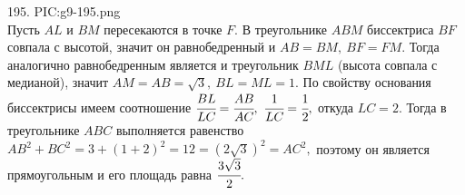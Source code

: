 195. {{PIC:g9-195.png}}\\
Пусть $AL$ и $BM$ пересекаются в точке $F.$ В треугольнике $ABM$ биссектриса $BF$ совпала с высотой, значит он равнобедренный и $AB=BM,\ BF=FM.$ Тогда аналогично равнобедренным является и треугольник $BML$ (высота совпала с медианой), значит $AM=AB=\sqrt{3},\ BL=ML=1.$ По свойству основания биссектрисы имеем соотношение
$\cfrac{BL}{LC}=\cfrac{AB}{AC},\ \cfrac{1}{LC}=\cfrac{1}{2},$ откуда $LC=2.$ Тогда в треугольнике $ABC$ выполняется равенство $AB^2+BC^2=3+(1+2)^2=12=(2\sqrt{3})^2=AC^2,$ поэтому он является прямоугольным и его площадь равна $\cfrac{3\sqrt{3}}{2}.$\\

